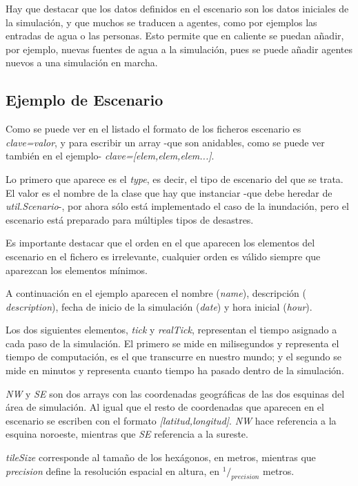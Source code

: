 Hay que destacar que los datos definidos en el escenario son los datos
iniciales de la simulación, y que muchos se traducen a agentes, como por
ejemplos las entradas de agua o las personas. Esto permite que en caliente se
puedan añadir, por ejemplo, nuevas fuentes de agua a la simulación, pues se
puede añadir agentes nuevos a una simulación en marcha.

\subsection*{Ejemplo de Escenario}



Como se puede ver en el listado el formato de los ficheros escenario es {\em
clave=valor}, y para escribir un array -que son anidables, como se puede ver
también en el ejemplo- {\em clave=[elem,elem,elem...]}.

Lo primero que aparece es el {\em type}, es decir, el tipo de escenario del que
se trata. El valor es el nombre de la clase que hay que instanciar -que debe
heredar de {\em util.Scenario}-, por ahora sólo está implementado el caso de la
inundación, pero el escenario está preparado para múltiples tipos de desastres.

Es importante destacar que el orden en el que aparecen los elementos del
escenario en el fichero es irrelevante, cualquier orden es válido siempre que
aparezcan los elementos mínimos.

A continuación en el ejemplo aparecen el nombre ({\em name}), descripción ({\em
description}), fecha de inicio de la simulación ({\em date}) y hora inicial
({\em hour}).

Los dos siguientes elementos, {\em tick} y {\em realTick}, representan el
tiempo asignado a cada paso de la simulación. El primero se mide en
milisegundos y representa el tiempo de computación, es el que transcurre en
nuestro mundo; y el segundo se mide en minutos y representa cuanto tiempo ha
pasado dentro de la simulación.

{\em NW} y {\em SE} son dos arrays con las coordenadas geográficas de las dos
esquinas del área de simulación. Al igual que el resto de coordenadas que
aparecen en el escenario se escriben con el formato {\em [latitud,longitud]}.
{\em NW} hace referencia a la esquina noroeste, mientras que {\em SE}
referencia a la sureste.

{\em tileSize} corresponde al tamaño de los hexágonos, en metros, mientras que
{\em precision} define la resolución espacial en altura, en
\begin{math}^1/_{precision}\end{math} metros.

